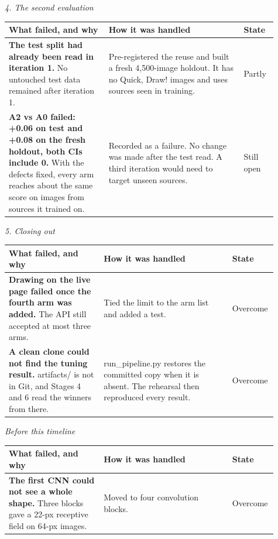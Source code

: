 \medskip

\textit{4. The second evaluation}

\begin{tabular}{p{0.34\linewidth}p{0.46\linewidth}p{0.11\linewidth}}
\toprule
What failed, and why & How it was handled & State \\
\midrule
\textbf{The test split had already been read in iteration 1.} No untouched test data remained after iteration 1. & Pre-registered the reuse and built a fresh 4,500-image holdout. It has no Quick, Draw! images and uses sources seen in training. & Partly \\
\textbf{A2 vs A0 failed: +0.06 on test and +0.08 on the fresh holdout, both CIs include 0.} With the defects fixed, every arm reaches about the same score on images from sources it trained on. & Recorded as a failure. No change was made after the test read. A third iteration would need to target unseen sources. & Still open \\
\bottomrule
\end{tabular}

\medskip

\textit{5. Closing out}

\begin{tabular}{p{0.34\linewidth}p{0.46\linewidth}p{0.11\linewidth}}
\toprule
What failed, and why & How it was handled & State \\
\midrule
\textbf{Drawing on the live page failed once the fourth arm was added.} The API still accepted at most three arms. & Tied the limit to the arm list and added a test. & Overcome \\
\textbf{A clean clone could not find the tuning result.} artifacts/ is not in Git, and Stages 4 and 6 read the winners from there. & run\_pipeline.py restores the committed copy when it is absent. The rehearsal then reproduced every result. & Overcome \\
\bottomrule
\end{tabular}

\medskip

\textit{Before this timeline}

\begin{tabular}{p{0.34\linewidth}p{0.46\linewidth}p{0.11\linewidth}}
\toprule
What failed, and why & How it was handled & State \\
\midrule
\textbf{The first CNN could not see a whole shape.} Three blocks gave a 22-px receptive field on 64-px images. & Moved to four convolution blocks. & Overcome \\
\bottomrule
\end{tabular}

